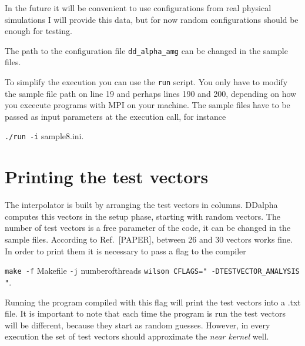 \documentclass[a4paper,12pt]{scrartcl}
\begin{document}
\hspace{2mm}

In the future it will be convenient to use configurations from real physical simulations I will provide this data, but for now random configurations should be enough for testing.
 
The path to the configuration file \texttt{dd\_alpha\_amg} can be changed in the sample files. 

To simplify the execution you can use the \texttt{run} script. You only have to modify the sample file path on line 19 and perhaps lines 190 and 200, depending on how you excecute programs with MPI on your machine. The sample files have to be passed as input parameters at the execution call, for instance \begin{center}

\texttt{./run -i} sample8.ini.                                                                                                                                                                                                                                                            \end{center}


\section{Printing the test vectors}
The interpolator is built by arranging the test vectors in columns. DDalpha computes this vectors in the setup phase, starting with random vectors. The number of test vectors is a free parameter of the code, it can be changed in the sample files. According to Ref.\ [PAPER], between 26 and 30 vectors works fine. In order to print them it is necessary to pass a flag to the compiler

\begin{center}
\texttt{make -f} Makefile \texttt{-j} numberofthreads \texttt{wilson CFLAGS=" -DTESTVECTOR\_ANALYSIS "}.
\end{center}
Running the program compiled with this flag will print the test vectors into a .txt file. It is important to note that each time the program is run the test vectors will be different, because they start as random guesses. However, in every execution the set of test vectors should approximate the \textit{near kernel} well.
\end{document}
